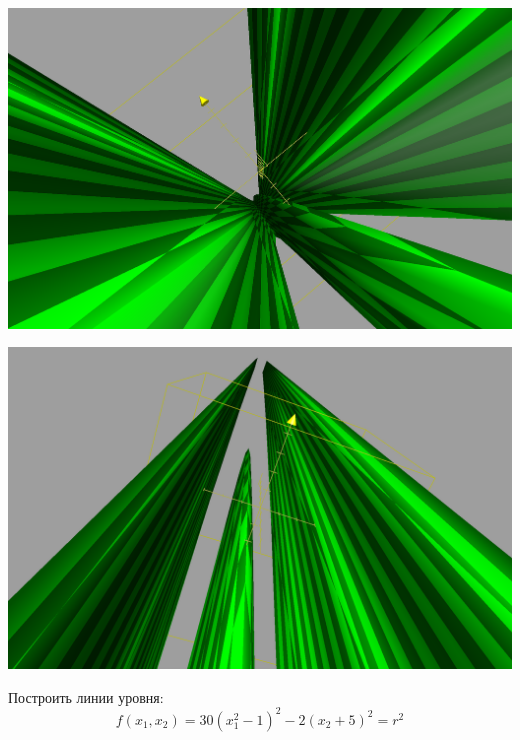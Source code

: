 \documentclass[a4paper, 12pt]{article}   	%
\begin{document}
    \begin{center}
        \begin{minipage}{0.47\linewidth}
            \includegraphics[width=\linewidth]{img/1_upper_view}
        \end{minipage}
        \begin{minipage}{0.47\linewidth}
            \includegraphics[width=\linewidth]{img/1_down_view}
        \end{minipage}
    \end{center}

    Построить линии уровня:
    \begin{equation*}
        f(x_1, x_2) = 30 (x^2_1-1)^2 - 2(x_2+5)^2 = r^2
    \end{equation*}
    
\end{document}
